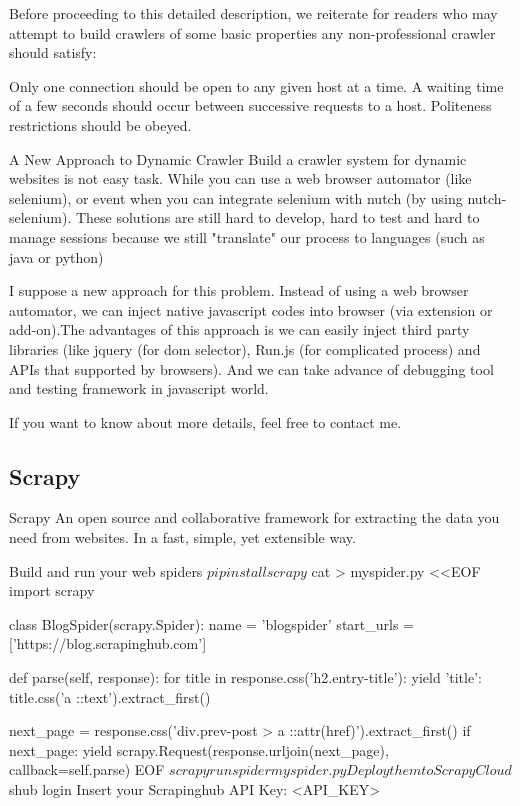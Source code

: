 {Before proceeding to this detailed description, we reiterate for readers who may attempt to build crawlers of some basic properties any non-professional crawler should satisfy:

Only one connection should be open to any given host at a time.
A waiting time of a few seconds should occur between successive requests to a host.
Politeness restrictions should be obeyed.

A New Approach to Dynamic Crawler
Build a crawler system for dynamic websites is not easy task. While you can use a web browser automator (like selenium), or event when you can integrate selenium with nutch (by using nutch-selenium). These solutions are still hard to develop, hard to test and hard to manage sessions because we still "translate" our process to languages (such as java or python)

I suppose a new approach for this problem. Instead of using a web browser automator, we can inject native javascript codes into browser (via extension or add-on).The advantages of this approach is we can easily inject third party libraries (like jquery (for dom selector), Run.js (for complicated process) and APIs that supported by browsers). And we can take advance of debugging tool and testing framework in javascript world.

If you want to know about more details, feel free to contact me.

\subsection{Scrapy}

Scrapy
An open source and collaborative framework for extracting the data you need from websites. In a fast, simple, yet extensible way.

Build and run your web spiders
$ pip install scrapy
$ cat > myspider.py <<EOF
import scrapy

class BlogSpider(scrapy.Spider):
    name = 'blogspider'
    start_urls = ['https://blog.scrapinghub.com']

    def parse(self, response):
        for title in response.css('h2.entry-title'):
            yield {'title': title.css('a ::text').extract_first()}

        next_page = response.css('div.prev-post > a ::attr(href)').extract_first()
        if next_page:
            yield scrapy.Request(response.urljoin(next_page), callback=self.parse)
EOF
$ scrapy runspider myspider.py
Deploy them to Scrapy Cloud
$ shub login
Insert your Scrapinghub API Key: <API_KEY>

}
